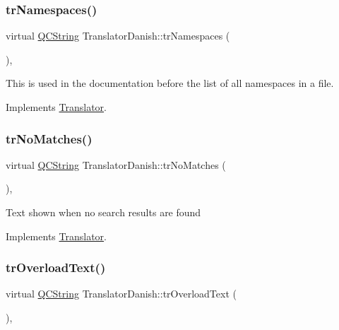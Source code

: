 \subsubsection{\texorpdfstring{trNamespaces()}{trNamespaces()}}
{\footnotesize\ttfamily virtual \mbox{\hyperlink{class_q_c_string}{Q\+C\+String}} Translator\+Danish\+::tr\+Namespaces (\begin{DoxyParamCaption}{ }\end{DoxyParamCaption})\hspace{0.3cm}{\ttfamily [inline]}, {\ttfamily [virtual]}}

This is used in the documentation before the list of all namespaces in a file. 

Implements \mbox{\hyperlink{class_translator}{Translator}}.

\mbox{\label{class_translator_danish_a94da6629b40041ddec9f763aef31ba44}} 
\subsubsection{\texorpdfstring{trNoMatches()}{trNoMatches()}}
{\footnotesize\ttfamily virtual \mbox{\hyperlink{class_q_c_string}{Q\+C\+String}} Translator\+Danish\+::tr\+No\+Matches (\begin{DoxyParamCaption}{ }\end{DoxyParamCaption})\hspace{0.3cm}{\ttfamily [inline]}, {\ttfamily [virtual]}}

Text shown when no search results are found 

Implements \mbox{\hyperlink{class_translator}{Translator}}.

\mbox{\label{class_translator_danish_a610a64a8aaec8ff73acaf6c42c98433b}} 
\subsubsection{\texorpdfstring{trOverloadText()}{trOverloadText()}}
{\footnotesize\ttfamily virtual \mbox{\hyperlink{class_q_c_string}{Q\+C\+String}} Translator\+Danish\+::tr\+Overload\+Text (\begin{DoxyParamCaption}{ }\end{DoxyParamCaption})\hspace{0.3cm}{\ttfamily [inline]}, {\ttfamily [virtual]}}

